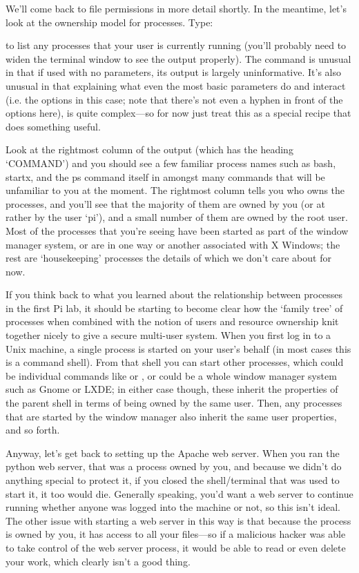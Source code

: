 We'll come back to file permissions in more detail shortly. In the meantime, let's look at the ownership model for processes. Type:

to list any processes that your user is currently running (you'll probably need to widen the terminal window to see the output properly). The  command is unusual in that if used with no parameters, its output is largely uninformative. It's also unusual in that explaining what even the most basic parameters do and interact (i.e. the  options in this case; note that there's not even a hyphen in front of the options here), is quite complex---so for now just treat this as a special recipe that does something useful. 

Look at the rightmost column of the output (which has the heading `COMMAND') and you should see a few familiar process names such as bash, startx, and the ps command itself in amongst many commands that will be unfamiliar to you at the moment. The rightmost column tells you who owns the processes, and you'll see that the majority of them are owned by you (or at rather by the user `pi'), and a small number of them are owned by the root user. Most of the processes that you're seeing have been started as part of the window manager system, or are in one way or another associated with X Windows; the rest are `housekeeping' processes the details of which we don't care about for now. 

If you think back to what you learned about the relationship between processes in the first Pi lab, it should be starting to become clear how the `family tree' of processes when combined with the notion of users and resource ownership knit together nicely to give a secure multi-user system. When you first log in to a Unix machine, a single process is started on your user's behalf (in most cases this is a command shell). From that shell you can start other processes, which could be individual commands like  or , or could be a whole window manager system such as Gnome or LXDE; in either case though, these inherit the properties of the parent shell in terms of being owned by the same user. Then, any processes that are started by the window manager also inherit the same user properties, and so forth. 

Anyway, let's get back to setting up the Apache web server. When you ran the python web server, that was a process owned by you, and because we didn't do anything special to protect it, if you closed the shell/terminal that was used to start it, it too would die. Generally speaking, you'd want a web server to continue running whether anyone was logged into the machine or not, so this isn't ideal. The other issue with starting a web server in this way is that because the process is owned by you, it has access to all your files---so if a malicious hacker was able to take control of the web server process, it would be able to read or even delete your work, which clearly isn't a good thing. 

